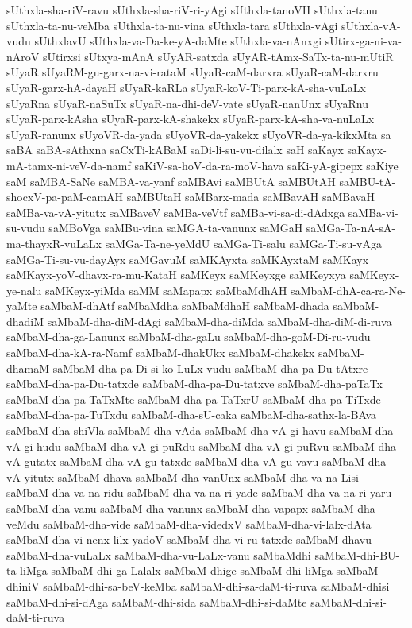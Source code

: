 {sUthxla-sha-riV-ravu
sUthxla-sha-riV-ri-yAgi
sUthxla-tanoVH
sUthxla-tanu
sUthxla-ta-nu-veMba
sUthxla-ta-nu-vina
sUthxla-tara
sUthxla-vAgi
sUthxla-vA-vudu
sUthxlavU
sUthxla-va-Da-ke-yA-daMte
sUthxla-va-nAnxgi
sUtirx-ga-ni-va-nAroV
sUtirxsi
sUtxya-mAnA
sUyAR-satxda
sUyAR-tAmx-SaTx-ta-nu-mUtiR
sUyaR
sUyaRM-gu-garx-na-vi-rataM
sUyaR-caM-darxra
sUyaR-caM-darxru
sUyaR-garx-hA-dayaH
sUyaR-kaRLa
sUyaR-koV-Ti-parx-kA-sha-vuLaLx
sUyaRna
sUyaR-naSuTx
sUyaR-na-dhi-deV-vate
sUyaR-nanUnx
sUyaRnu
sUyaR-parx-kAsha
sUyaR-parx-kA-shakekx
sUyaR-parx-kA-sha-va-nuLaLx
sUyaR-ranunx
sUyoVR-da-yada
sUyoVR-da-yakekx
sUyoVR-da-ya-kikxMta
sa
saBA
saBA-sAthxna
saCxTi-kABaM
saDi-li-su-vu-dilalx
saH
saKayx
saKayx-mA-tamx-ni-veV-da-namf
saKiV-sa-hoV-da-ra-moV-hava
saKi-yA-gipepx
saKiye
saM
saMBA-SaNe
saMBA-va-yanf
saMBAvi
saMBUtA
saMBUtAH
saMBU-tA-shocxV-pa-paM-camAH
saMBUtaH
saMBarx-mada
saMBavAH
saMBavaH
saMBa-va-vA-yitutx
saMBaveV
saMBa-veVtf
saMBa-vi-sa-di-dAdxga
saMBa-vi-su-vudu
saMBoVga
saMBu-vina
saMGA-ta-vanunx
saMGaH
saMGa-Ta-nA-sA-ma-thayxR-vuLaLx
saMGa-Ta-ne-yeMdU
saMGa-Ti-salu
saMGa-Ti-su-vAga
saMGa-Ti-su-vu-dayAyx
saMGavuM
saMKAyxta
saMKAyxtaM
saMKayx
saMKayx-yoV-dhavx-ra-mu-KataH
saMKeyx
saMKeyxge
saMKeyxya
saMKeyx-ye-nalu
saMKeyx-yiMda
saMM
saMapapx
saMbaMdhAH
saMbaM-dhA-ca-ra-Ne-yaMte
saMbaM-dhAtf
saMbaMdha
saMbaMdhaH
saMbaM-dhada
saMbaM-dhadiM
saMbaM-dha-diM-dAgi
saMbaM-dha-diMda
saMbaM-dha-diM-di-ruva
saMbaM-dha-ga-Lanunx
saMbaM-dha-gaLu
saMbaM-dha-goM-Di-ru-vudu
saMbaM-dha-kA-ra-Namf
saMbaM-dhakUkx
saMbaM-dhakekx
saMbaM-dhamaM
saMbaM-dha-pa-Di-si-ko-LuLx-vudu
saMbaM-dha-pa-Du-tAtxre
saMbaM-dha-pa-Du-tatxde
saMbaM-dha-pa-Du-tatxve
saMbaM-dha-paTaTx
saMbaM-dha-pa-TaTxMte
saMbaM-dha-pa-TaTxrU
saMbaM-dha-pa-TiTxde
saMbaM-dha-pa-TuTxdu
saMbaM-dha-sU-caka
saMbaM-dha-sathx-la-BAva
saMbaM-dha-shiVla
saMbaM-dha-vAda
saMbaM-dha-vA-gi-havu
saMbaM-dha-vA-gi-hudu
saMbaM-dha-vA-gi-puRdu
saMbaM-dha-vA-gi-puRvu
saMbaM-dha-vA-gutatx
saMbaM-dha-vA-gu-tatxde
saMbaM-dha-vA-gu-vavu
saMbaM-dha-vA-yitutx
saMbaM-dhava
saMbaM-dha-vanUnx
saMbaM-dha-va-na-Lisi
saMbaM-dha-va-na-ridu
saMbaM-dha-va-na-ri-yade
saMbaM-dha-va-na-ri-yaru
saMbaM-dha-vanu
saMbaM-dha-vanunx
saMbaM-dha-vapapx
saMbaM-dha-veMdu
saMbaM-dha-vide
saMbaM-dha-videdxV
saMbaM-dha-vi-lalx-dAta
saMbaM-dha-vi-nenx-lilx-yadoV
saMbaM-dha-vi-ru-tatxde
saMbaM-dhavu
saMbaM-dha-vuLaLx
saMbaM-dha-vu-LaLx-vanu
saMbaMdhi
saMbaM-dhi-BU-ta-liMga
saMbaM-dhi-ga-Lalalx
saMbaM-dhige
saMbaM-dhi-liMga
saMbaM-dhiniV
saMbaM-dhi-sa-beV-keMba
saMbaM-dhi-sa-daM-ti-ruva
saMbaM-dhisi
saMbaM-dhi-si-dAga
saMbaM-dhi-sida
saMbaM-dhi-si-daMte
saMbaM-dhi-si-daM-ti-ruva
}
